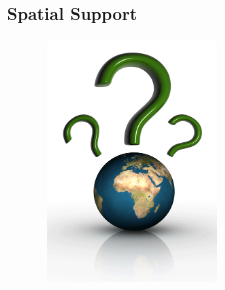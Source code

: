 \documentclass[hyperref={pdfpagelabels=true}]{beamer}
\begin{document}
\begin{frame}
\frametitle{Spatial Support}
      \begin{figure}  
	\includegraphics[width=0.4\textwidth]{globe-question.png}
       \end{figure}  
\end{frame}
\end{document}
